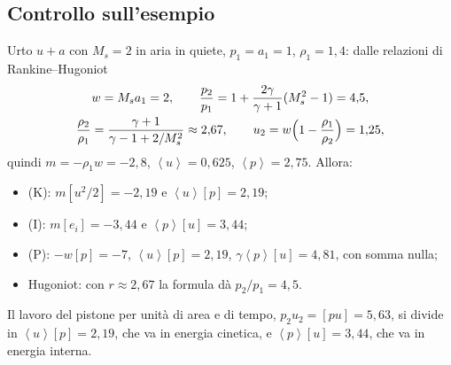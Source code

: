 \documentclass[11pt,a4paper]{article}
\newcommand{\jp}[1]{\left[#1\right]}            %
\newcommand{\av}[1]{\left\langle #1\right\rangle} %
\newcommand{\upa}{u+a}
\begin{document}
\subsection{Controllo sull'esempio}
Urto $\upa$ con $M_s=2$ in aria in quiete, $p_1=a_1=1$, $\rho_1=1{,}4$: dalle relazioni di Rankine--Hugoniot
\begin{gather*}
  w=M_sa_1=2,\qquad \frac{p_2}{p_1}=1+\frac{2\gamma}{\gamma+1}(M_s^2-1)=4{,}5,\\
  \frac{\rho_2}{\rho_1}=\frac{\gamma+1}{\gamma-1+2/M_s^2}\approx2{,}67,\qquad
  u_2=w\Bigl(1-\frac{\rho_1}{\rho_2}\Bigr)=1{,}25,
\end{gather*}
quindi $m=-\rho_1w=-2{,}8$, $\av{u}=0{,}625$, $\av{p}=2{,}75$. Allora:
\begin{itemize}
  \item (K): $m\jp{u^2/2}=-2{,}19$ e $\av{u}\jp{p}=2{,}19$;
  \item (I): $m\jp{e_i}=-3{,}44$ e $\av{p}\jp{u}=3{,}44$;
  \item (P): $-w\jp{p}=-7$, $\av{u}\jp{p}=2{,}19$, $\gamma\av{p}\jp{u}=4{,}81$, con somma nulla;
  \item Hugoniot: con $r\approx2{,}67$ la formula dà $p_2/p_1=4{,}5$.
\end{itemize}
Il lavoro del pistone per unità di area e di tempo, $p_2u_2=\jp{pu}=5{,}63$, si divide in $\av{u}\jp{p}=2{,}19$,
che va in energia cinetica, e $\av{p}\jp{u}=3{,}44$, che va in energia interna.

\end{document}
